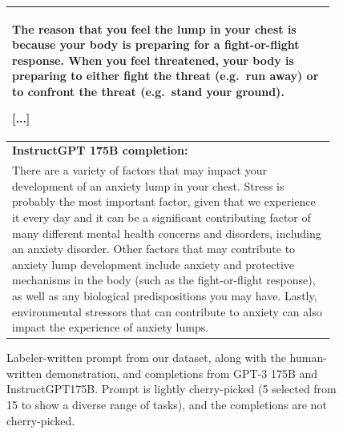 \documentclass{article}
\begin{document}
\begin{figure}[hp]
\begin{tabular}{p{0.95\linewidth}}
The reason that you feel the lump in your chest is because your body is preparing for a fight-or-flight response. When you feel threatened, your body is preparing to either fight the threat (e.g.\ run away) or to confront the threat (e.g.\ stand your ground).

[...]

\\ \midrule 
\textbf{InstructGPT 175B completion:} \\
There are a variety of factors that may impact your development of an anxiety lump in your chest. Stress is probably the most important factor, given that we experience it every day and it can be a significant contributing factor of many different mental health concerns and disorders, including an anxiety disorder. Other factors that may contribute to anxiety lump development include anxiety and protective mechanisms in the body (such as the fight-or-flight response), as well as any biological predispositions you may have. Lastly, environmental stressors that can contribute to anxiety can also impact the experience of anxiety lumps.
\\ \bottomrule
    \end{tabular}
    \caption{Labeler-written prompt from our dataset, along with the human-written demonstration, and completions from GPT-3 175B and InstructGPT175B. Prompt is lightly cherry-picked (5 selected from 15 to show a diverse range of tasks), and the completions are not cherry-picked.}
    \label{fig:qual_labeler_5}
\end{figure}
\end{document}
